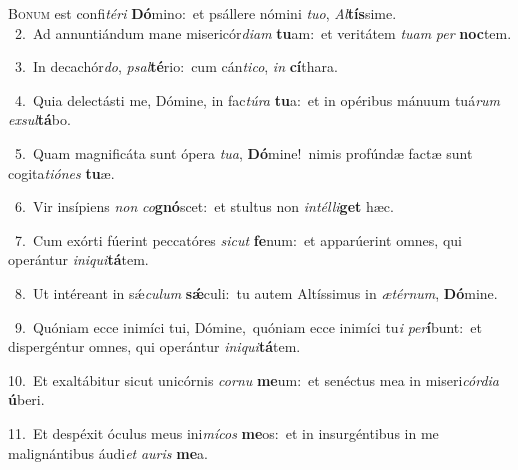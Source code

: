 \lettrine{\initial\textcolor{\initialcolor}{B}}{onum} est confi\-\textit{té}\-\textit{ri} \textbf{Dó}\-mino:~\star et psállere nómini \textit{tu}\-\textit{o}, \textit{Al}\-\textbf{tís}sime.\\
{\numbfont\textcolor{\numbcolor}{~2.}}~Ad annuntiándum mane misericór\-\textit{di}\-\textit{am} \textbf{tu}\-am:~\star et veritátem \textit{tu}\-\textit{am} \textit{per} \textbf{noc}\-tem.\par
{\numbfont\textcolor{\numbcolor}{~3.}}~In decachór\-\textit{do}\-, \textit{psal}\-\textbf{té}rio:~\star cum cán\-\textit{ti}\-\textit{co}, \textit{in} \textbf{cí}\-thara.\par
{\numbfont\textcolor{\numbcolor}{~4.}}~Quia delectásti me, Dómine, in fac\-\textit{tú}\-\textit{ra} \textbf{tu}\-a:~\star et in opéribus mánuum tuá\textit{rum} \textit{ex}\-\textit{sul}\textbf{tá}bo.\par
{\numbfont\textcolor{\numbcolor}{~5.}}~Quam magnificáta sunt ópera \textit{tu}\-\textit{a}, \textbf{Dó}\-mine!~\star nimis profúndæ factæ sunt cogita\-\textit{ti}\-\textit{ó}\textit{nes} \textbf{tu}\-æ.\par
{\numbfont\textcolor{\numbcolor}{~6.}}~Vir insípiens \textit{non} \textit{co}\-\textbf{gnó}scet:~\star et stultus non \textit{in}\-\textit{tél}\textit{li}\textbf{get} hæc.\par
{\numbfont\textcolor{\numbcolor}{~7.}}~Cum exórti fúerint peccatóres \textit{sic}\-\textit{ut} \textbf{fe}\-num:~\star et apparúerint omnes, qui operántur \textit{in}\-\textit{i}\textit{qui}\textbf{tá}tem.\par
{\numbfont\textcolor{\numbcolor}{~8.}}~Ut intéreant in sǽ\-\textit{cu}\-\textit{lum} \textbf{sǽ}\-culi:~\star tu autem Altíssimus in \textit{æ}\-\textit{tér}\textit{num}, \textbf{Dó}\-mine.\par
{\numbfont\textcolor{\numbcolor}{~9.}}~Quóniam ecce inimíci tui, Dómine,~\dagger quóniam ecce inimíci tu\textit{i} \textit{per}\-\textbf{í}bunt:~\star et dispergéntur omnes, qui operántur \textit{in}\-\textit{i}\textit{qui}\textbf{tá}tem.\par
{\numbfont\textcolor{\numbcolor}{10.}}~Et exaltábitur sicut unicórnis \textit{cor}\-\textit{nu} \textbf{me}\-um:~\star et senéctus mea in miseri\-\textit{cór}\-\textit{di}\textit{a} \textbf{ú}\-beri.\par
{\numbfont\textcolor{\numbcolor}{11.}}~Et despéxit óculus meus ini\-\textit{mí}\-\textit{cos} \textbf{me}\-os:~\star et in insurgéntibus in me malignántibus áudi\textit{et} \textit{au}\-\textit{ris} \textbf{me}\-a.\par
